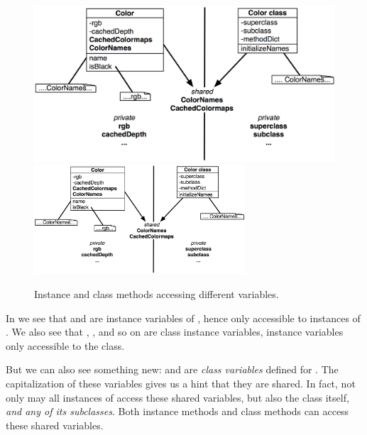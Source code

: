 \documentclass[a4paper,10pt,twoside]{book}
\begin{document}
\begin{figure}[htb]
\begin{center}
\ifluluelse
	{\includegraphics[width=\textwidth]{privateSharedVarColor}}
	{\includegraphics[width=0.7\textwidth]{privateSharedVarColor}}
\caption{Instance and class methods accessing different 
variables.}
\end{center}
\end{figure}

In  we see that  and  are instance variables of , hence only accessible to instances of .
We also see that , ,  and so on are class instance variables, \ie instance variables only accessible to the  class.

But we can also see something new:  and  are \emph{class variables} defined for .
The capitalization of these variables gives us a hint that they are shared.
In fact, not only may all instances of  access these shared variables, but also the  class itself, \emph{and any of its subclasses}.
Both instance methods and class methods can access these shared variables.

\end{document}
